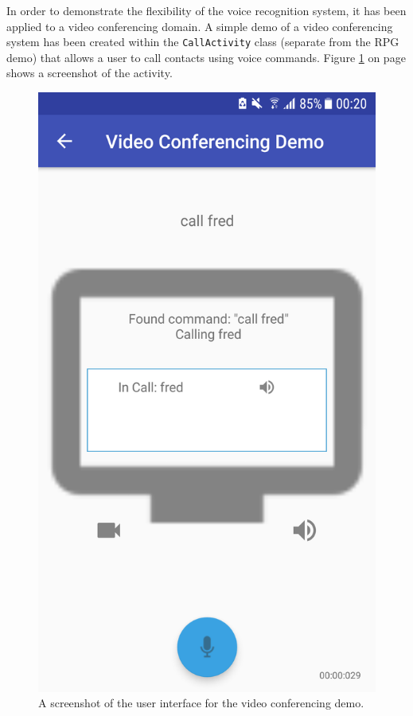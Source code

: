 \documentclass[11pt]{article}
\begin{document}
In order to demonstrate the flexibility of the voice recognition system, it has been applied to a video conferencing domain. A simple demo of a video conferencing system has been created within the \texttt{CallActivity} class (separate from the RPG demo) that allows a user to call contacts using voice commands. Figure \ref{fig:snapshot-calling} on page \pageref{fig:snapshot-calling} shows a screenshot of the activity.
\\
\begin{figure}
\begin{center}
  \includegraphics[scale=0.3]{snapshot-calling.png}
  \caption{A screenshot of the user interface for the video conferencing demo.}
  \label{fig:snapshot-calling}
  \end{center}
\end{figure}
\end{document}
